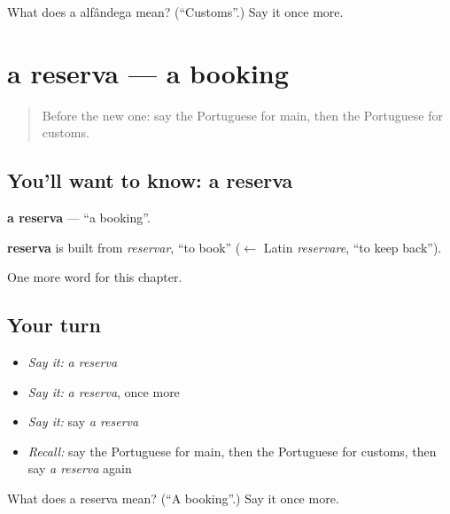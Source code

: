 \begin{tcolorbox}[breakable,colback=teal!4,colframe=teal!35!black,title={Before you move on}]
What does a alfândega mean? (\textquotedblleft{}Customs\textquotedblright{}.) Say it once more.
\end{tcolorbox}
\section[a reserva]{a reserva — a booking}

\label{lesson:PT-C244-reserva}



\begin{quote}
Before the new one: say the Portuguese for main, then the Portuguese for customs.
\end{quote}

\subsection*{You'll want to know: a reserva}
\textbf{a reserva} — \textquotedblleft{}a booking\textquotedblright{}.

\begin{cousinweb}
\textbf{reserva} is built from \emph{reservar}, \textquotedblleft{}to book\textquotedblright{} ($\leftarrow$ Latin \emph{reservare}, \textquotedblleft{}to keep back\textquotedblright{}).
\end{cousinweb}

\begin{grammarlens}[title={What you've built}]
One more word for this chapter.
\end{grammarlens}

\subsection*{Your turn}
\begin{itemize}
\raggedright
  \item \emph{Say it:} \emph{a reserva}
  \item \emph{Say it:} \emph{a reserva}, once more
  \item \emph{Say it:} say \emph{a reserva}
  \item \emph{Recall:} say the Portuguese for main, then the Portuguese for customs, then say \emph{a reserva} again
\end{itemize}

\begin{tcolorbox}[breakable,colback=teal!4,colframe=teal!35!black,title={Before you move on}]
What does a reserva mean? (\textquotedblleft{}A booking\textquotedblright{}.) Say it once more.
\end{tcolorbox}
